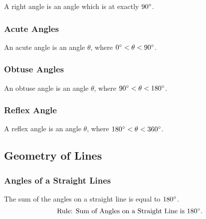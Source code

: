 \documentclass{report}
\begin{document}
\begin{flushleft}
\begin{center}
\end{center}
A right angle is an angle which is at exactly $90\degree$.

\subsubsection{Acute Angles}
\begin{center}
\end{center}
An acute angle is an angle $\theta$, where $0\degree < \theta < 90\degree$.

\subsubsection{Obtuse Angles}
\begin{center}
\end{center}
An obtuse angle is an angle $\theta$, where $90\degree < \theta < 180\degree$.

\subsubsection{Reflex Angle}
\begin{center}
\end{center}
A reflex angle is an angle $\theta$, where $180\degree < \theta < 360\degree$.


\subsection{Geometry of Lines}
\subsubsection{Angles of a Straight Lines}
\begin{center}
\end{center}
The sum of the angles on a straight line is equal to $180\degree$.
\[
\text{Rule: Sum of Angles on a Straight Line is 180\degree}.
\]


\end{flushleft}
\end{document}
